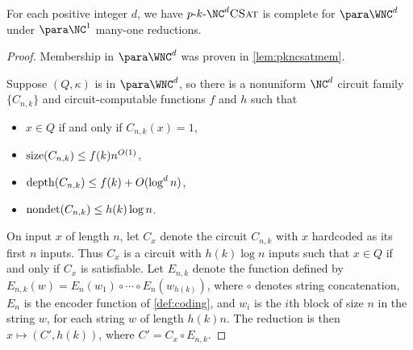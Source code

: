 \begin{theorem}\label{thm:parawncdcomplete}
  For each positive integer $d$, we have $\pNCSAT$ is complete for $\para \WNC^d$ under $\para \NC^1$ many-one reductions.
\end{theorem}
\begin{proof}
  Membership in $\para \WNC^d$ was proven in \autoref{lem:pkncsatmem}.

  Suppose $(Q, \kappa)$ is in $\para \WNC^d$, so there is a nonuniform $\NC^d$ circuit family $\{C_{n, k}\}$ and circuit-computable functions $f$ and $h$ such that
  \begin{itemize}
  \item $x \in Q$ if and only if $C_{n, k}(x) = 1$,
  \item $\operatorname{size}(C_{n, k}) \leq f(k) n^{O(1)}$,
  \item $\operatorname{depth}(C_{n, k}) \leq f(k) + O(\log^d n)$,
  \item $\operatorname{nondet}(C_{n, k}) \leq h(k) \log n$.
  \end{itemize}
  On input $x$ of length $n$, let $C_x$ denote the circuit $C_{n, k}$ with $x$ hardcoded as its first $n$ inputs.
  Thus $C_x$ is a circuit with $h(k) \log n$ inputs such that $x \in Q$ if and only if $C_x$ is satisfiable.
  Let $E_{n, k}$ denote the function defined by $E_{n, k}(w) = E_n(w_1) \circ \dotsb \circ E_n(w_{h(k)})$, where $\circ$ denotes string concatenation, $E_n$ is the encoder function of \autoref{def:coding}, and $w_i$ is the $i$th block of size $n$ in the string $w$, for each string $w$ of length $h(k) n$.
  The reduction is then $x \mapsto (C', h(k))$, where $C' = C_x \circ E_{n, k}$.


\end{proof}

